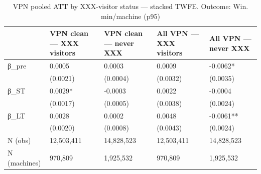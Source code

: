 \begin{table}

\caption{VPN pooled ATT by XXX-visitor status — stacked TWFE. Outcome: Win. min/machine (p95)}
\centering
\begin{tabular}[t]{lllll}
\toprule
  & VPN clean — XXX visitors & VPN clean — never XXX & All VPN — XXX visitors & All VPN — never XXX\\
\midrule
β\_pre & 0.0005 & 0.0003 & 0.0009 & -0.0062*\\
 & (0.0021) & (0.0004) & (0.0032) & (0.0035)\\
β\_ST & 0.0029* & -0.0003 & 0.0022 & -0.0004\\
 & (0.0017) & (0.0005) & (0.0038) & (0.0024)\\
β\_LT & 0.0028 & 0.0002 & 0.0048 & -0.0061**\\
\addlinespace
 & (0.0020) & (0.0008) & (0.0043) & (0.0024)\\
N (obs) & 12,503,411 & 14,828,523 & 12,503,411 & 14,828,523\\
N (machines) & 970,809 & 1,925,532 & 970,809 & 1,925,532\\
\bottomrule
\end{tabular}
\end{table}
